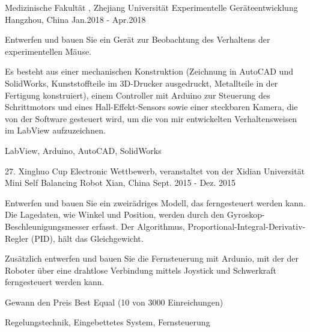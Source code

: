 \begin{cventries}
  \cventry
    {Medizinische Fakultät , Zhejiang Universität} %
    {Experimentelle Geräteentwicklung}
    {Hangzhou, China} %
    {Jan.2018 - Apr.2018} %
    {
      \begin{cvitems} %
        \item {Entwerfen und bauen Sie ein Gerät zur Beobachtung des Verhaltens der experimentellen Mäuse.}
        \item {Es besteht aus einer mechanischen Konstruktion (Zeichnung in AutoCAD und SolidWorks, Kunststoffteile im 3D-Drucker ausgedruckt, Metallteile in der Fertigung konstruiert), einem Controller mit Arduino zur Steuerung des Schrittmotors und eines Hall-Effekt-Sensors sowie einer steckbaren Kamera, die von der Software gesteuert wird, um die von mir entwickelten Verhaltensweisen im LabView aufzuzeichnen.}
      \end{cvitems}
    }{LabView, Arduino, AutoCAD, SolidWorks}

  \cventry
    {27. Xinghuo Cup Electronic Wettbewerb, veranstaltet von der Xidian Universität} %
    {Mini Self Balancing Robot} %
    {Xian, China} %
    {Sept. 2015 - Dez. 2015} %
    {
      \begin{cvitems} %
        \item {Entwerfen und bauen Sie ein zweirädriges Modell, das ferngesteuert werden kann. Die Lagedaten, wie Winkel und Position, werden durch den Gyroskop-Beschleunigungsmesser erfasst. Der Algorithmus, Proportional-Integral-Derivativ-Regler (PID), hält das Gleichgewicht. }
       \item {Zusätzlich entwerfen und bauen Sie die Fernsteuerung mit Ardunio, mit der der Roboter über eine drahtlose Verbindung mittels Joystick und Schwerkraft ferngesteuert werden kann.}
       \item {Gewann den Preis Best Equal (10 von 3000 Einreichungen)}
      \end{cvitems}
    }{Regelungstechnik, Eingebettetes System, Fernsteuerung}

\end{cventries}
